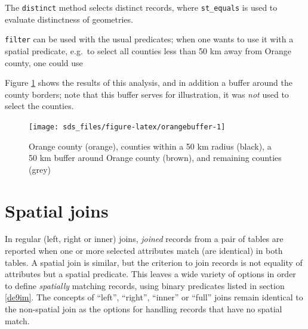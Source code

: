 \documentclass[]{book}
\newenvironment{Shaded}{\begin{snugshade}}{\end{snugshade}}
\newcommand{\CommentTok}[1]{\textcolor[rgb]{0.56,0.35,0.01}{\textit{#1}}}
\newcommand{\DecValTok}[1]{\textcolor[rgb]{0.00,0.00,0.81}{#1}}
\newcommand{\KeywordTok}[1]{\textcolor[rgb]{0.13,0.29,0.53}{\textbf{#1}}}
\newcommand{\NormalTok}[1]{#1}
\newcommand{\OperatorTok}[1]{\textcolor[rgb]{0.81,0.36,0.00}{\textbf{#1}}}
\newcommand{\StringTok}[1]{\textcolor[rgb]{0.31,0.60,0.02}{#1}}
\begin{document}
The \texttt{distinct} method selects distinct records, where \texttt{st\_equals}
is used to evaluate distinctness of geometries.

\texttt{filter} can be used with the usual predicates; when one wants to
use it with a spatial predicate, e.g.~to select all counties less
than 50 km away from Orange county, one could use

\begin{Shaded}
\end{Shaded}

Figure \ref{fig:orangebuffer} shows the results of this analysis,
and in addition a buffer around the county borders; note that this buffer
serves for illustration, it was \emph{not} used to select the counties.

\begin{figure}

{\centering \texttt{[image: sds\_files/figure-latex/orangebuffer-1]} 

}

\caption{Orange county (orange), counties within a 50 km radius (black), a 50 km buffer around Orange county (brown), and remaining counties (grey)}\label{fig:orangebuffer}
\end{figure}

\hypertarget{spatial-joins}{%
\section{Spatial joins}\label{spatial-joins}}

In regular (left, right or inner) joins, \emph{joined} records from a
pair of tables are reported when one or more selected attributes
match (are identical) in both tables. A spatial join is similar,
but the criterion to join records is not equality of attributes but
a spatial predicate. This leaves a wide variety of options in order
to define \emph{spatially} matching records, using binary predicates
listed in section \ref{de9im}. The concepts of ``left'', ``right'',
``inner'' or ``full'' joins remain identical to the non-spatial join
as the options for handling records that have no spatial match.
\end{document}
